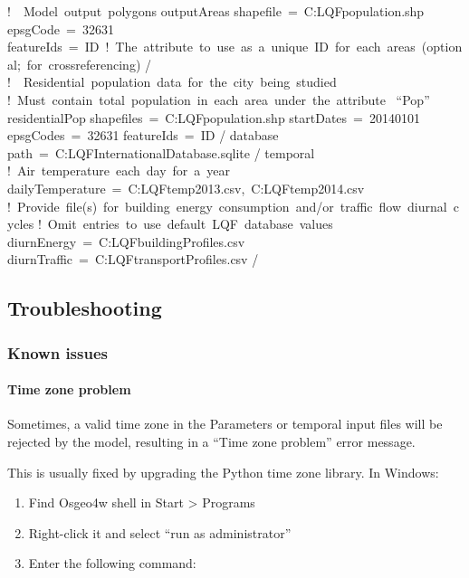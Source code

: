 \documentclass[letterpaper,10pt,english]{sphinxmanual}
\begin{document}
%
\begin{sphinxVerbatim}[commandchars=\\\{\}]
! \PYGZsh{}\PYGZsh{}\PYGZsh{} Model output polygons
\PYGZam{}outputAreas
   shapefile = \PYGZsq{}C:\PYGZbs{}LQF\PYGZbs{}population.shp\PYGZsq{}
   epsgCode = 32631
   featureIds = \PYGZsq{}ID\PYGZsq{} ! The attribute to use as a unique ID for each areas (optional; for cross\PYGZhy{}referencing)
/
! \PYGZsh{}\PYGZsh{}\PYGZsh{} Residential population data for the city being studied
! Must contain total population in each area under the attribute \PYGZbs{} “Pop”
\PYGZam{}residentialPop
   shapefiles = \PYGZsq{}C:\PYGZbs{}LQF\PYGZbs{}population.shp\PYGZsq{}
   startDates = \PYGZsq{}2014\PYGZhy{}01\PYGZhy{}01\PYGZsq{}
   epsgCodes = 32631
   featureIds = \PYGZsq{}ID\PYGZsq{}
/
\PYGZam{}database
   path = \PYGZsq{}C:\PYGZbs{}LQF\PYGZbs{}InternationalDatabase.sqlite\PYGZsq{}
/
\PYGZam{}temporal
   ! Air temperature each day for a year
   dailyTemperature = \PYGZsq{}C:\PYGZbs{}LQF\PYGZbs{}temp\PYGZus{}2013.csv\PYGZsq{}, \PYGZsq{}C:\PYGZbs{}LQF\PYGZbs{}temp\PYGZus{}2014.csv\PYGZsq{}
   ! Provide file(s) for building energy consumption and/or traffic flow diurnal cycles
   ! Omit entries to use default LQF database values
   diurnEnergy = \PYGZsq{}C:\PYGZbs{}LQF\PYGZbs{}buildingProfiles.csv\PYGZsq{}
   diurnTraffic = \PYGZsq{}C:\PYGZbs{}LQF\PYGZbs{}transportProfiles.csv\PYGZsq{}
/
\end{sphinxVerbatim}


\subsection{Troubleshooting}
\label{\detokenize{OtherManuals/LQF_Manual:troubleshooting}}

\subsubsection{Known issues}
\label{\detokenize{OtherManuals/LQF_Manual:known-issues}}

\paragraph{Time zone problem}
\label{\detokenize{OtherManuals/LQF_Manual:time-zone-problem}}
Sometimes, a valid time zone in the Parameters or temporal input files
will be rejected by the model, resulting in a “Time zone problem” error
message.

This is usually fixed by upgrading the Python time zone library. In
Windows:
\begin{enumerate}
\item {} 
Find Osgeo4w shell in Start \textgreater{} Programs

\item {} 
Right-click it and select “run as administrator”

\item {} 
Enter the following command:

\end{enumerate}
\end{document}
